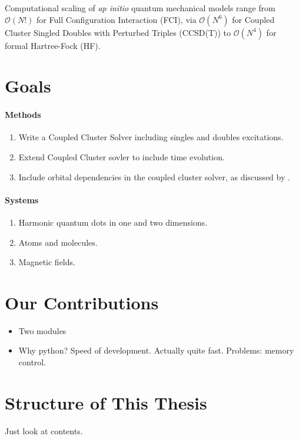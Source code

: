     Computational scaling of \emph{ap initio} quantum mechanical models range from 
    $\mathcal{O}(N!)$ for Full Configuration Interaction (FCI), via $\mathcal{O}(N^6)$ 
    for Coupled Cluster Singled Doubles with Perturbed Triples (CCSD(T)) to 
    $\mathcal{O}(N^4)$ for formal Hartree-Fock (HF)\cite{ratcliff2017challenges}.


\section{Goals}

    \paragraph{Methods}
    \begin{enumerate}
        \item Write a Coupled Cluster Solver including singles and doubles excitations.
        \item Extend Coupled Cluster sovler to include time evolution.
        \item Include orbital dependencies in the coupled cluster solver, as 
            discussed by \citeauthor{kvaal2012ab}\cite{kvaal2012ab}.
    \end{enumerate}

    \paragraph{Systems}
    \begin{enumerate}
        \item Harmonic quantum dots in one and two dimensions.
        \item Atoms and molecules.
        \item Magnetic fields. 
    \end{enumerate}

\section{Our Contributions}

    \begin{itemize}
        \item Two modules
        \item Why python? Speed of development. Actually quite fast. 
            Problems: memory control.
    \end{itemize}

\section{Structure of This Thesis}

Just look at contents.
